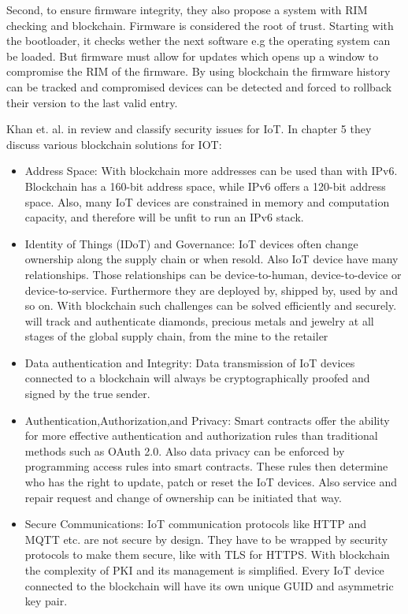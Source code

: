 Second, to ensure firmware integrity, they also propose a system with RIM checking and blockchain. 
Firmware is considered the root of trust. Starting with the bootloader, it checks wether the next software e.g the operating system can be loaded.
But firmware must allow for updates which opens up a window to compromise the RIM of the firmware. By using blockchain the firmware history can be tracked and compromised devices can be detected and forced to rollback their 
version to the last valid entry.

Khan et. al. in \cite{Khan2018} review and classify security issues for IoT.
In chapter 5 they discuss various blockchain solutions for IOT:

\begin{itemize}
  \item {Address Space: With blockchain more addresses can be used than with IPv6. Blockchain has a 160-bit address space, while IPv6 offers a 120-bit address space.
  Also, many IoT devices are constrained in memory and computation capacity, and therefore will be unfit to run an IPv6 stack.}
  \item {Identity of Things (IDoT) and Governance: IoT devices often change ownership along the supply chain or when resold. Also IoT device have many relationships. Those relationships can be device-to-human, device-to-device or device-to-service. Furthermore they are deployed by, shipped by, used by and so on. With blockchain such challenges can be solved efficiently and securely.
  will track and authenticate diamonds, precious metals and jewelry at all stages of the global supply chain, from the mine to the retailer}
  \item {Data authentication and Integrity: Data transmission of IoT devices connected to a blockchain will always be  cryptographically proofed and signed by the true sender.}
  \item {Authentication,Authorization,and Privacy: Smart contracts offer the ability for more effective authentication and authorization rules than traditional methods such as  OAuth 2.0. Also data privacy can be enforced by programming access rules into smart contracts. These rules then determine who has the right to update, patch or reset the IoT devices. Also service and repair request and change of ownership can be initiated that way. }
  \item {Secure Communications: IoT communication protocols like HTTP and MQTT etc. are not secure by design. They have to be wrapped by security protocols to make them secure, like with TLS for HTTPS.
  With blockchain the complexity of PKI and its management is simplified. Every IoT device connected to the blockchain will have its own unique GUID and asymmetric key pair. }
\end{itemize}



